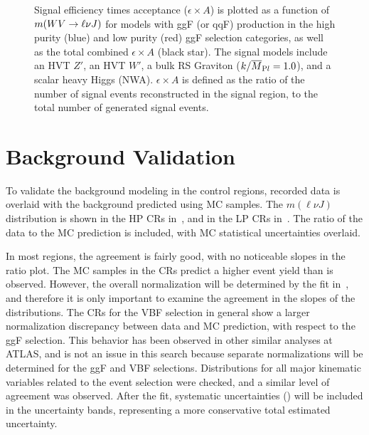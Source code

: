 \begin{figure}[tbp]
\caption[Signal efficiency times acceptance for models with gluon gluon fusion production]{Signal efficiency times acceptance ($\epsilon\times A$) is plotted as a function of $m(WV\rightarrow\ell\nu J)$ for models with ggF (or qqF) production in the high purity (blue) and low purity (red) ggF selection categories, as well as the total combined $\epsilon\times A$ (black star). The signal models include \protect{} an HVT $Z'$, \protect{} an HVT $W'$, \protect{} a bulk RS Graviton ($k/\overline{M}_{\textrm Pl}=1.0$), and \protect{} a scalar heavy Higgs (NWA). $\epsilon\times A$ is defined as the ratio of the number of signal events reconstructed in the signal region, to the total number of generated signal events.}
\label{fig:sig_acc_ggf}
\end{figure}

%
\clearpage
\section{Background Validation}
To validate the background modeling in the control regions, recorded data is overlaid with the background predicted using MC samples. The $m(\ell\nu J)$ distribution is shown in the HP CRs in~\Fig{\ref{fig:datamc_hpcr}}, and in the LP CRs in~\Fig{\ref{fig:datamc_lpcr}}. The ratio of the data to the MC prediction is included, with MC statistical uncertainties overlaid. 

In most regions, the agreement is fairly good, with no noticeable slopes in the ratio plot. The MC samples in the \Wjets CRs predict a higher event yield than is observed. However, the overall normalization will be determined by the fit in~\Ch{\ref{ch:stats}}, and therefore it is only important to examine the agreement in the slopes of the distributions. The CRs for the VBF selection in general show a larger normalization discrepancy between data and MC prediction, with respect to the ggF selection. This behavior has been observed in other similar analyses at ATLAS, and is not an issue in this search because separate normalizations will be determined for the ggF and VBF selections. Distributions for all major kinematic variables related to the event selection were checked, and a similar level of agreement was observed. After the fit, systematic uncertainties (\Ch{\ref{ch:syst}}) will be included in the uncertainty bands, representing a more conservative total estimated uncertainty. 


